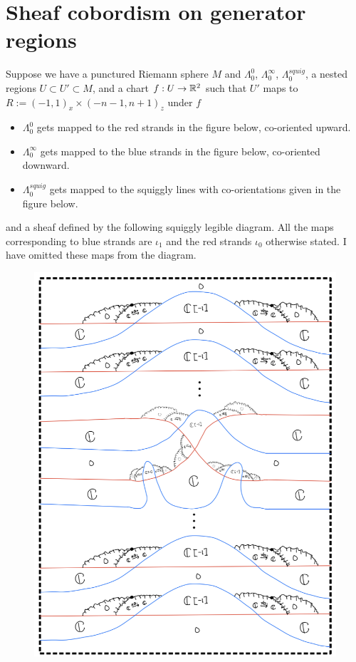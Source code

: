 \section{Sheaf cobordism on generator regions}
Suppose we have a punctured Riemann sphere $M$ and $\Lambda_0^0$, $\Lambda_0^\infty$, $\Lambda_0^{squig}$, a nested regions $U\subset U' \subset M$, and a chart $f : U \rightarrow \mathbb{R}^2$ such that $U'$ maps to $R:=(-1,1)_x \times (-n-1,n+1)_z$ under $f$
\begin{itemize}
\item $\Lambda_0^0$ gets mapped to the red strands in the figure below, co-oriented upward.

\item $\Lambda_0^\infty$ gets mapped to the blue strands in the figure below, co-oriented downward.

\item $\Lambda_0^{squig}$ gets mapped to the squiggly lines with co-orientations given in the figure below.
\end{itemize}
and a sheaf defined by the following squiggly legible diagram. All the maps corresponding to blue strands are $\iota_1$ and the red strands $\iota_0$ otherwise stated. I have omitted these maps from the diagram.\\

\begin{figure}[H]
    \centering
    \includegraphics[scale = 0.95]{diagrams/cobord_gen/1.png}
    \caption{}
    \label{fig:your-label}
\end{figure}

